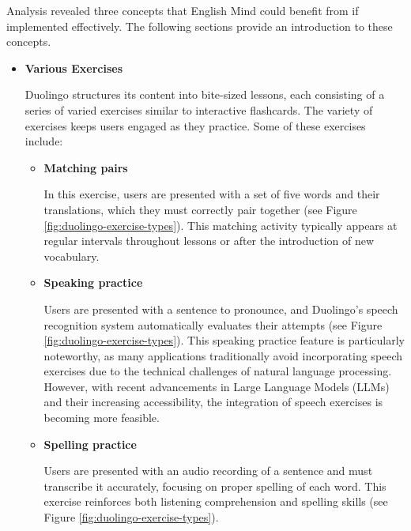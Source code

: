 Analysis revealed three concepts that English Mind could benefit from if implemented effectively. The following sections provide an introduction to these concepts.

\begin{itemize}
    \item \textbf{Various Exercises}

    Duolingo structures its content into bite-sized lessons, each consisting of a series of varied exercises similar to interactive flashcards. The variety of exercises keeps users engaged as they practice. Some of these exercises include:

    \begin{itemize}
        \item \textbf{Matching pairs}

        In this exercise, users are presented with a set of five words and their translations, which they must correctly pair together (see Figure \ref{fig:duolingo-exercise-types}). This matching activity typically appears at regular intervals throughout lessons or after the introduction of new vocabulary.
        
        \item \textbf{Speaking practice}

        Users are presented with a sentence to pronounce, and Duolingo's speech recognition system automatically evaluates their attempts (see Figure \ref{fig:duolingo-exercise-types}). This speaking practice feature is particularly noteworthy, as many applications traditionally avoid incorporating speech exercises due to the technical challenges of natural language processing. However, with recent advancements in Large Language Models (LLMs) and their increasing accessibility, the integration of speech exercises is becoming more feasible.
        
        \item \textbf{Spelling practice}

        Users are presented with an audio recording of a sentence and must transcribe it accurately, focusing on proper spelling of each word. This exercise reinforces both listening comprehension and spelling skills (see Figure \ref{fig:duolingo-exercise-types}).
    \end{itemize}


\end{itemize}
